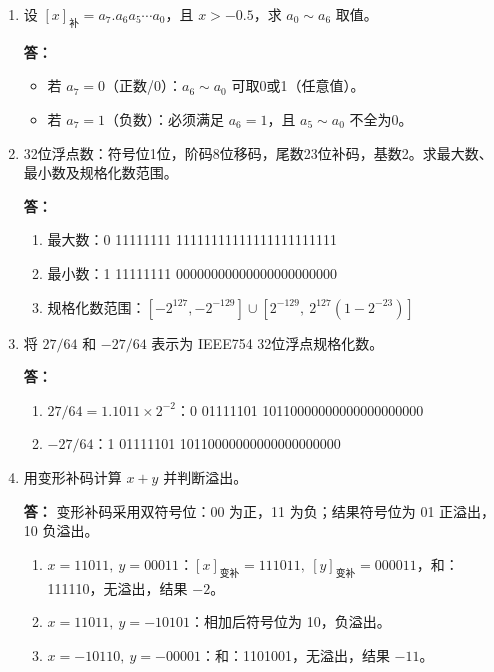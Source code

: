 \documentclass{article}
\begin{document}
\begin{enumerate}[label=\arabic*.]
    \item 设 $[x]_{\text{补}} = a_7.a_6a_5\cdots a_0$，且 $x > -0.5$，求 $a_0\sim a_6$ 取值。
    
    \textbf{答：}
    \begin{itemize}
        \item 若 $a_7=0$（正数/0）：$a_6\sim a_0$ 可取0或1（任意值）。
        \item 若 $a_7=1$（负数）：必须满足 $a_6=1$，且 $a_5\sim a_0$ 不全为0。
    \end{itemize}

    \item 32位浮点数：符号位1位，阶码8位移码，尾数23位补码，基数2。求最大数、最小数及规格化数范围。
    
    \textbf{答：}
    \begin{enumerate}[label=(\arabic*)]
        \item 最大数：0 11111111 11111111111111111111111
        \item 最小数：1 11111111 00000000000000000000000
        \item 规格化数范围：$[-2^{127}, -2^{-129}] \cup [2^{-129},\ 2^{127}(1-2^{-23})]$
    \end{enumerate}

    \item 将 $27/64$ 和 $-27/64$ 表示为 IEEE754 32位浮点规格化数。
    
    \textbf{答：}
    \begin{enumerate}[label=(\arabic*)]
        \item $27/64 = 1.1011\times 2^{-2}$：0 01111101 10110000000000000000000
        \item $-27/64$：1 01111101 10110000000000000000000
    \end{enumerate}

    \item 用变形补码计算 $x+y$ 并判断溢出。
    
    \textbf{答：}
    变形补码采用双符号位：00 为正，11 为负；结果符号位为 01 正溢出，10 负溢出。
    \begin{enumerate}[label=(\arabic*)]
        \item $x=11011,\ y=00011$：$[x]_{\text{变补}}=111011,\ [y]_{\text{变补}}=000011$，和：111110，无溢出，结果 $-2$。
        \item $x=11011,\ y=-10101$：相加后符号位为 10，负溢出。
        \item $x=-10110,\ y=-00001$：和：1101001，无溢出，结果 $-11$。
    \end{enumerate}


\end{enumerate}
\end{document}
